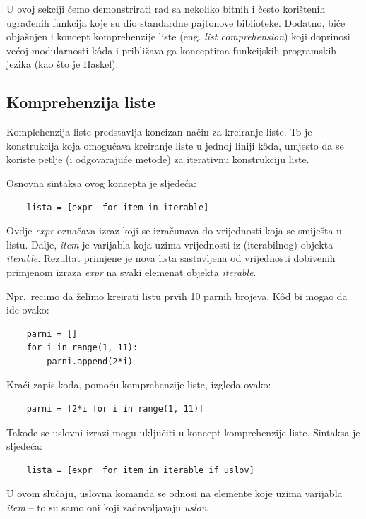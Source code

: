 U ovoj sekciji ćemo demonstrirati rad sa nekoliko bitnih i često korištenih ugrađenih funkcija koje su dio standardne pajtonove biblioteke. Dodatno, biće objašnjen i koncept komprehenzije liste (eng. \textit{list comprehension}) koji  doprinosi većoj modularnosti k\^oda i približava ga konceptima funkcijskih programskih jezika (kao što je Haskel). 

\subsection{Komprehenzija liste}

Komplehenzija liste predstavlja koncizan način za kreiranje liste. To je konstrukcija koja omogućava kreiranje liste u jednoj liniji k\^oda, umjesto da se koriste petlje (i odgovarajuće metode) za iterativnu konstrukciju liste.

Osnovna sintaksa ovog koncepta je sljedeća:

\begin{verbatim}
	lista = [expr  for item in iterable]
\end{verbatim}
Ovdje \textit{expr} označava izraz koji se izračunava do vrijednosti koja se smiješta u listu.
Dalje, \textit{item} je varijabla koja  uzima vrijednosti iz (iterabilnog) objekta \textit{iterable}.  Rezultat primjene je nova lista sastavljena od  vrijednosti dobivenih primjenom izraza  \textit{expr} na svaki elemenat objekta \textit{iterable}.

Npr.\ recimo da želimo kreirati listu prvih 10 parnih brojeva. K\^od bi mogao da ide ovako:

\begin{verbatim}
	parni = []
	for i in range(1, 11):
	    parni.append(2*i)
\end{verbatim}

Kraći zapis koda, pomoću komprehenzije liste, izgleda ovako:


\begin{verbatim}
	parni = [2*i for i in range(1, 11)]
\end{verbatim}
Takođe se  uslovni izrazi  mogu uključiti u koncept komprehenzije liste. Sintaksa je sljedeća:

\begin{verbatim}
	lista = [expr  for item in iterable if uslov]
\end{verbatim}
U ovom slučaju, uslovna komanda se odnosi na elemente koje uzima varijabla \textit{item} -- to su samo oni koji zadovoljavaju \textit{uslov}. 

